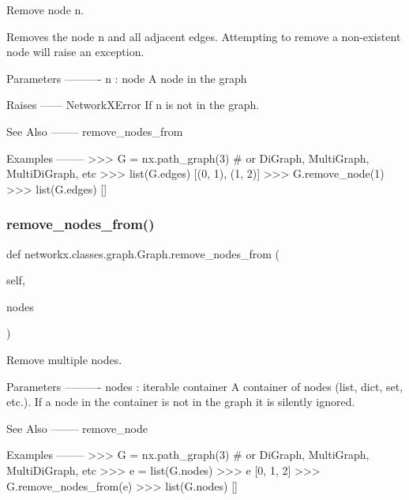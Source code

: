 \begin{DoxyVerb}Remove node n.

Removes the node n and all adjacent edges.
Attempting to remove a non-existent node will raise an exception.

Parameters
----------
n : node
   A node in the graph

Raises
------
NetworkXError
   If n is not in the graph.

See Also
--------
remove_nodes_from

Examples
--------
>>> G = nx.path_graph(3)  # or DiGraph, MultiGraph, MultiDiGraph, etc
>>> list(G.edges)
[(0, 1), (1, 2)]
>>> G.remove_node(1)
>>> list(G.edges)
[]\end{DoxyVerb}
 \mbox{\label{classnetworkx_1_1classes_1_1graph_1_1Graph_a3259883c1fdd7a28c224af3cee9f27c6}} 
\subsubsection{\texorpdfstring{remove\+\_\+nodes\+\_\+from()}{remove\_nodes\_from()}}
{\footnotesize\ttfamily def networkx.\+classes.\+graph.\+Graph.\+remove\+\_\+nodes\+\_\+from (\begin{DoxyParamCaption}\item[{}]{self,  }\item[{}]{nodes }\end{DoxyParamCaption})}

\begin{DoxyVerb}Remove multiple nodes.

Parameters
----------
nodes : iterable container
    A container of nodes (list, dict, set, etc.).  If a node
    in the container is not in the graph it is silently
    ignored.

See Also
--------
remove_node

Examples
--------
>>> G = nx.path_graph(3)  # or DiGraph, MultiGraph, MultiDiGraph, etc
>>> e = list(G.nodes)
>>> e
[0, 1, 2]
>>> G.remove_nodes_from(e)
>>> list(G.nodes)
[]\end{DoxyVerb}
 \mbox{\label{classnetworkx_1_1classes_1_1graph_1_1Graph_a77c3649ca7ade87814d9d2ae514277a4}} 
